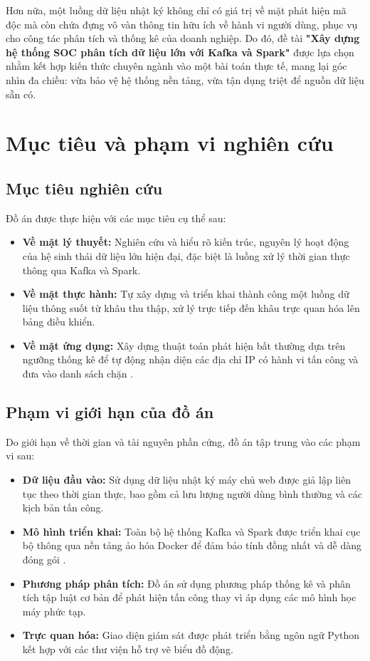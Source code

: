 \documentclass[12pt,a4paper]{report}
\begin{document}
Hơn nữa, một luồng dữ liệu nhật ký không chỉ có giá trị về mặt phát hiện mã độc mà còn chứa đựng vô vàn thông tin hữu ích về hành vi người dùng, phục vụ cho công tác phân tích và thống kê của doanh nghiệp. Do đó, đề tài \textbf{"Xây dựng hệ thống SOC phân tích dữ liệu lớn với Kafka và Spark"} được lựa chọn nhằm kết hợp kiến thức chuyên ngành vào một bài toán thực tế, mang lại góc nhìn đa chiều: vừa bảo vệ hệ thống nền tảng, vừa tận dụng triệt để nguồn dữ liệu sẵn có.

\section{Mục tiêu và phạm vi nghiên cứu}
\subsection{Mục tiêu nghiên cứu}
Đồ án được thực hiện với các mục tiêu cụ thể sau:
\begin{itemize}
    \item \textbf{Về mặt lý thuyết:} Nghiên cứu và hiểu rõ kiến trúc, nguyên lý hoạt động của hệ sinh thái dữ liệu lớn hiện đại, đặc biệt là luồng xử lý thời gian thực thông qua Kafka và Spark.
    \item \textbf{Về mặt thực hành:} Tự xây dựng và triển khai thành công một luồng dữ liệu thông suốt từ khâu thu thập, xử lý trực tiếp đến khâu trực quan hóa lên bảng điều khiển.
    \item \textbf{Về mặt ứng dụng:} Xây dựng thuật toán phát hiện bất thường dựa trên ngưỡng thống kê để tự động nhận diện các địa chỉ IP có hành vi tấn công và đưa vào danh sách chặn \cite{anomaly_spark}.
\end{itemize}

\subsection{Phạm vi giới hạn của đồ án}
Do giới hạn về thời gian và tài nguyên phần cứng, đồ án tập trung vào các phạm vi sau:
\begin{itemize}
    \item \textbf{Dữ liệu đầu vào:} Sử dụng dữ liệu nhật ký máy chủ web được giả lập liên tục theo thời gian thực, bao gồm cả lưu lượng người dùng bình thường và các kịch bản tấn công.
    \item \textbf{Mô hình triển khai:} Toàn bộ hệ thống Kafka và Spark được triển khai cục bộ thông qua nền tảng ảo hóa Docker để đảm bảo tính đồng nhất và dễ dàng đóng gói \cite{docker_doc}.
    \item \textbf{Phương pháp phân tích:} Đồ án sử dụng phương pháp thống kê và phân tích tập luật cơ bản để phát hiện tấn công thay vì áp dụng các mô hình học máy phức tạp.
    \item \textbf{Trực quan hóa:} Giao diện giám sát được phát triển bằng ngôn ngữ Python kết hợp với các thư viện hỗ trợ vẽ biểu đồ động.
\end{itemize}
\end{document}
